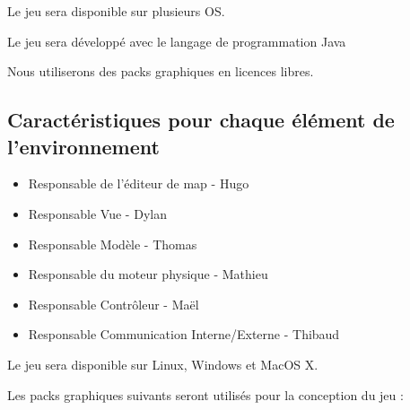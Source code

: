 \documentclass[11pt]{report}
\begin{document}
				Le jeu sera disponible sur plusieurs OS.
				
				Le jeu sera développé avec le langage de programmation Java
				
				Nous utiliserons des packs graphiques en licences libres.
    		
    		\subsection{Caractéristiques pour chaque élément de l’environnement}
    		
    			\begin{itemize}
    				\item Responsable de l’éditeur de map - Hugo
    				\item Responsable Vue - Dylan
					\item Responsable Modèle - Thomas
					\item Responsable du moteur physique - Mathieu
					\item Responsable Contrôleur - Maël
					\item Responsable Communication Interne/Externe - Thibaud
    			\end{itemize}
    			
    			Le jeu sera disponible sur Linux, Windows et MacOS X.
    			
        		Les packs graphiques suivants seront utilisés pour la conception du jeu :
				 
\end{document}
